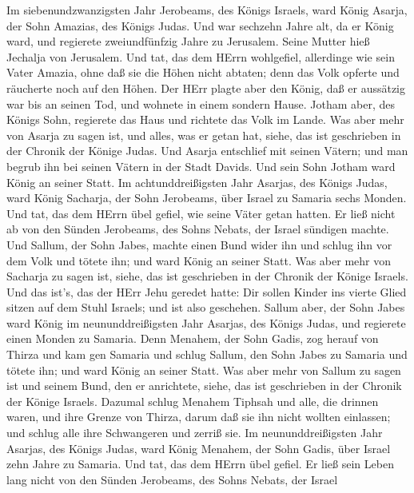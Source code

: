 Im siebenundzwanzigsten Jahr Jerobeams, des Königs Israels,
ward König Asarja, der Sohn Amazias, des Königs Judas.  Und
war sechzehn Jahre alt, da er König ward, und regierete zweiundfünfzig
Jahre zu Jerusalem. Seine Mutter hieß Jechalja von Jerusalem.
 Und tat, das dem HErrn wohlgefiel, allerdinge wie sein
Vater Amazia,  ohne daß sie die Höhen nicht abtaten; denn
das Volk opferte und räucherte noch auf den Höhen.  Der HErr
plagte aber den König, daß er aussätzig war bis an seinen Tod, und
wohnete in einem sondern Hause. Jotham aber, des Königs Sohn, regierete
das Haus und richtete das Volk im Lande.  Was aber mehr von
Asarja zu sagen ist, und alles, was er getan hat, siehe, das ist
geschrieben in der Chronik der Könige Judas.  Und Asarja
entschlief mit seinen Vätern; und man begrub ihn bei seinen Vätern in
der Stadt Davids. Und sein Sohn Jotham ward König an seiner Statt.
 Im achtunddreißigsten Jahr Asarjas, des Königs Judas, ward
König Sacharja, der Sohn Jerobeams, über Israel zu Samaria sechs Monden.
 Und tat, das dem HErrn übel gefiel, wie seine Väter getan
hatten. Er ließ nicht ab von den Sünden Jerobeams, des Sohns Nebats, der
Israel sündigen machte.  Und Sallum, der Sohn Jabes, machte
einen Bund wider ihn und schlug ihn vor dem Volk und tötete ihn; und
ward König an seiner Statt.  Was aber mehr von Sacharja zu
sagen ist, siehe, das ist geschrieben in der Chronik der Könige Israels.
 Und das ist's, das der HErr Jehu geredet hatte: Dir sollen
Kinder ins vierte Glied sitzen auf dem Stuhl Israels; und ist also
geschehen.  Sallum aber, der Sohn Jabes ward König im
neununddreißigsten Jahr Asarjas, des Königs Judas, und regierete einen
Monden zu Samaria.  Denn Menahem, der Sohn Gadis, zog
herauf von Thirza und kam gen Samaria und schlug Sallum, den Sohn Jabes
zu Samaria und tötete ihn; und ward König an seiner Statt. 
Was aber mehr von Sallum zu sagen ist und seinem Bund, den er
anrichtete, siehe, das ist geschrieben in der Chronik der Könige
Israels.  Dazumal schlug Menahem Tiphsah und alle, die
drinnen waren, und ihre Grenze von Thirza, darum daß sie ihn nicht
wollten einlassen; und schlug alle ihre Schwangeren und zerriß sie.
 Im neununddreißigsten Jahr Asarjas, des Königs Judas, ward
König Menahem, der Sohn Gadis, über Israel zehn Jahre zu Samaria.
 Und tat, das dem HErrn übel gefiel. Er ließ sein Leben
lang nicht von den Sünden Jerobeams, des Sohns Nebats, der Israel
